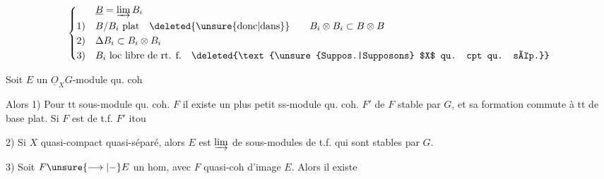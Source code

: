 
\[
\left\{\begin{aligned}
 &\underline{B}=\varinjlim B_i\\
1)\quad &B/B_i\ \text{plat}\quad\text{\deleted{\unsure{donc|dans}}}\qquad B_i\otimes B_i\subset B\otimes B\\
2)\quad &\Delta B_i\subset B_i\otimes B_i\\
3)\quad &B_i\ \text{loc libre de rt. f.}\quad \deleted{\text{\unsure{Suppos.|Supposons} $X$ qu. cpt qu. sép.}}
\end{aligned}\right.
\]

Soit $E$ un $\underline{O}_{X}G$-module qu. coh\ 

Alors 1) Pour tt sous-module qu. coh. $F$
il existe un plus petit ss-module qu.
coh. $F'$ de $F$  stable par $G$, et
sa formation commute à tt  de
base plat. Si $F$ est de t.f. $F'$ itou

2) Si $X$ quasi-compact quasi-séparé, alors
$E$ est $\varinjlim$ de sous-modules  de t.f.
qui sont stables par $G$.

3)  Soit $F\unsure{\longrightarrow|-}E$ un hom, avec $F$ quasi-coh 
 d'image  $E$. Alors il existe
